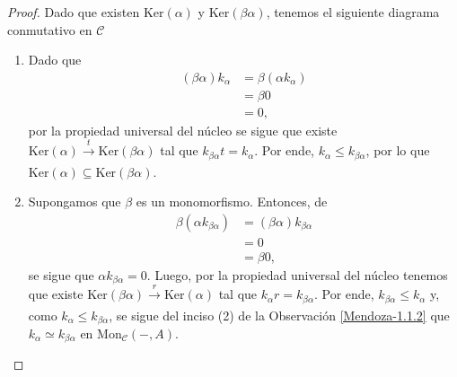 \documentclass[tesis]{subfiles}
\begin{document}
\begin{proof}
    Dado que existen $\text{Ker}(\alpha)$ y $\text{Ker}(\beta\alpha)$, tenemos el siguiente diagrama conmutativo en $\mathscr{C}$
    \begin{center}
    \end{center}

    \begin{enumerate}[label=(\alph*)]
    
        \item Dado que
            \begin{align*}
                (\beta\alpha)k_\alpha &= \beta(\alpha k_\alpha) \\
                                      &= \beta0 \\
                                      &= 0,
            \end{align*}
            por la propiedad universal del núcleo se sigue que existe $\text{Ker}(\alpha)\xrightarrow[]{t}\text{Ker}(\beta\alpha)$ tal que $k_{\beta\alpha}t = k_\alpha$. Por ende, $k_\alpha \le k_{\beta\alpha}$, por lo que $\text{Ker}(\alpha)\subseteq\text{Ker}(\beta\alpha)$.

        \item Supongamos que $\beta$ es un monomorfismo. Entonces, de
            \begin{align*}
                \beta(\alpha k_{\beta\alpha}) &= (\beta\alpha)k_{\beta\alpha} \\
                                              &= 0 \\
                                              &= \beta0,
            \end{align*}
            se sigue que $\alpha k_{\beta\alpha} = 0$. Luego, por la propiedad universal del núcleo tenemos que existe $\text{Ker}(\beta\alpha)\xrightarrow[]{r} \text{Ker}(\alpha)$ tal que $k_\alpha r=k_{\beta\alpha}$. Por ende, $k_{\beta\alpha}\le k_\alpha$ y, como $k_\alpha\le k_{\beta\alpha}$, se sigue del inciso (2) de la Observación \ref{Mendoza-1.1.2} que $k_\alpha\simeq k_{\beta\alpha}$ en $\text{Mon}_\mathscr{C}(-,A)$.
    \end{enumerate}
\end{proof}
\end{document}

